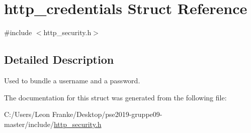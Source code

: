 \hypertarget{structhttp__credentials}{}\section{http\+\_\+credentials Struct Reference}
\label{structhttp__credentials}


{\ttfamily \#include $<$http\+\_\+security.\+h$>$}



\subsection{Detailed Description}
Used to bundle a username and a password. 

The documentation for this struct was generated from the following file\+:\begin{DoxyCompactItemize}
\item 
C\+:/\+Users/\+Leon Franke/\+Desktop/pse2019-\/gruppe09-\/master/include/\mbox{\hyperlink{http__security_8h}{http\+\_\+security.\+h}}\end{DoxyCompactItemize}
